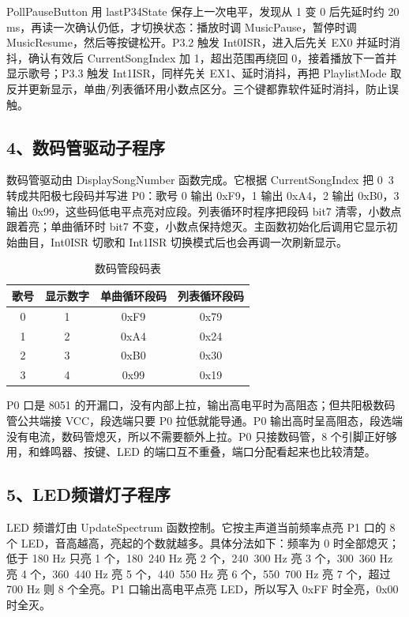 \documentclass[zihao=-4,a4paper]{ctexart}
\begin{document}
PollPauseButton 用 lastP34State 保存上一次电平，发现从 1 变 0 后先延时约 20 ms，再读一次确认仍低，才切换状态：播放时调 MusicPause，暂停时调 MusicResume，然后等按键松开。P3.2 触发 Int0ISR，进入后先关 EX0 并延时消抖，确认有效后 CurrentSongIndex 加 1，超出范围再绕回 0，接着播放下一首并显示歌号；P3.3 触发 Int1ISR，同样先关 EX1、延时消抖，再把 PlaylistMode 取反并更新显示，单曲/列表循环用小数点区分。三个键都靠软件延时消抖，防止误触。

\newpage

\subsection*{4、数码管驱动子程序}

数码管驱动由 DisplaySongNumber 函数完成。它根据 CurrentSongIndex 把 0~3 转成共阳极七段码并写进 P0：歌号 0 输出 0xF9，1 输出 0xA4，2 输出 0xB0，3 输出 0x99，这些码低电平点亮对应段。列表循环时程序把段码 bit7 清零，小数点跟着亮；单曲循环时 bit7 不变，小数点保持熄灭。主函数初始化后调用它显示初始曲目，Int0ISR 切歌和 Int1ISR 切换模式后也会再调一次刷新显示。

\begin{table}[H]
    \centering
    \caption{数码管段码表}
    \begin{tabular}{cccc}
    \toprule
    歌号 & 显示数字 & 单曲循环段码 & 列表循环段码 \\
    \midrule
    0 & 1 & 0xF9 & 0x79 \\
    1 & 2 & 0xA4 & 0x24 \\
    2 & 3 & 0xB0 & 0x30 \\
    3 & 4 & 0x99 & 0x19 \\
    \bottomrule
    \end{tabular}
\end{table}

P0 口是 8051 的开漏口，没有内部上拉，输出高电平时为高阻态；但共阳极数码管公共端接 VCC，段选端只要 P0 拉低就能导通。P0 输出高时呈高阻态，段选端没有电流，数码管熄灭，所以不需要额外上拉。P0 只接数码管，8 个引脚正好够用，和蜂鸣器、按键、LED 的端口互不重叠，端口分配看起来也比较清楚。


\subsection*{5、LED频谱灯子程序}

LED 频谱灯由 UpdateSpectrum 函数控制。它按主声道当前频率点亮 P1 口的 8 个 LED，音高越高，亮起的个数就越多。具体分法如下：频率为 0 时全部熄灭；低于 180 Hz 只亮 1 个，180~240 Hz 亮 2 个，240~300 Hz 亮 3 个，300~360 Hz 亮 4 个，360~440 Hz 亮 5 个，440~550 Hz 亮 6 个，550~700 Hz 亮 7 个，超过 700 Hz 则 8 个全亮。P1 口输出高电平点亮 LED，所以写入 0xFF 时全亮，0x00 时全灭。
\end{document}
